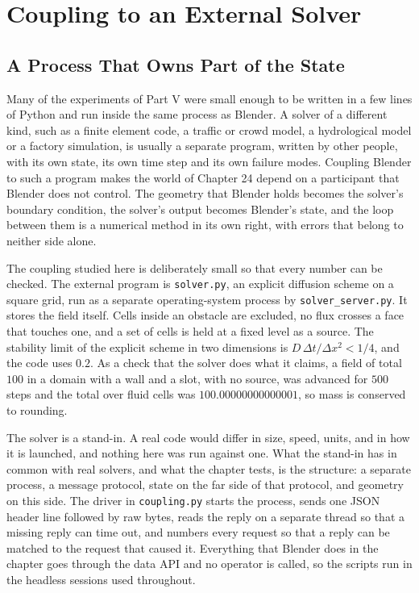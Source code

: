 \chapter{Coupling to an External Solver}

\section{A Process That Owns Part of the State}

Many of the experiments of Part V were small enough to be written in a few lines of Python and run inside the same process as Blender. A solver of a different kind, such as a finite element code, a traffic or crowd model, a hydrological model or a factory simulation, is usually a separate program, written by other people, with its own state, its own time step and its own failure modes. Coupling Blender to such a program makes the world of Chapter 24 depend on a participant that Blender does not control. The geometry that Blender holds becomes the solver's boundary condition, the solver's output becomes Blender's state, and the loop between them is a numerical method in its own right, with errors that belong to neither side alone.

The coupling studied here is deliberately small so that every number can be checked. The external program is \texttt{solver.py}, an explicit diffusion scheme on a square grid, run as a separate operating-system process by \texttt{solver\_server.py}. It stores the field itself. Cells inside an obstacle are excluded, no flux crosses a face that touches one, and a set of cells is held at a fixed level as a source. The stability limit of the explicit scheme in two dimensions is $D\,\Delta t/\Delta x^2 < 1/4$, and the code uses $0.2$. As a check that the solver does what it claims, a field of total $100$ in a domain with a wall and a slot, with no source, was advanced for $500$ steps and the total over fluid cells was $100.00000000000001$, so mass is conserved to rounding.



The solver is a stand-in. A real code would differ in size, speed, units, and in how it is launched, and nothing here was run against one. What the stand-in has in common with real solvers, and what the chapter tests, is the structure: a separate process, a message protocol, state on the far side of that protocol, and geometry on this side. The driver in \texttt{coupling.py} starts the process, sends one JSON header line followed by raw bytes, reads the reply on a separate thread so that a missing reply can time out, and numbers every request so that a reply can be matched to the request that caused it. Everything that Blender does in the chapter goes through the data API and no operator is called, so the scripts run in the headless sessions used throughout.

